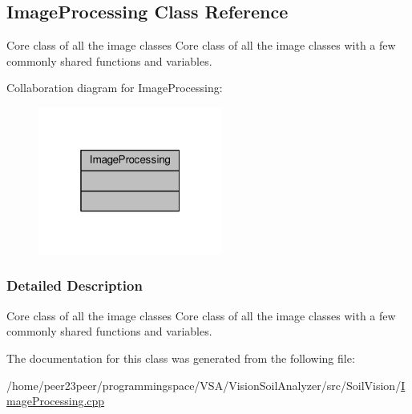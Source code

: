 \hypertarget{class_image_processing}{}\subsection{Image\+Processing Class Reference}
\label{class_image_processing}


Core class of all the image classes Core class of all the image classes with a few commonly shared functions and variables.  




Collaboration diagram for Image\+Processing\+:
\nopagebreak
\begin{figure}[H]
\begin{center}
\leavevmode
\includegraphics[width=172pt]{class_image_processing__coll__graph}
\end{center}
\end{figure}


\subsubsection{Detailed Description}
Core class of all the image classes Core class of all the image classes with a few commonly shared functions and variables. 

The documentation for this class was generated from the following file\+:\begin{DoxyCompactItemize}
\item 
/home/peer23peer/programmingspace/\+V\+S\+A/\+Vision\+Soil\+Analyzer/src/\+Soil\+Vision/\hyperlink{_image_processing_8cpp}{Image\+Processing.\+cpp}\end{DoxyCompactItemize}
